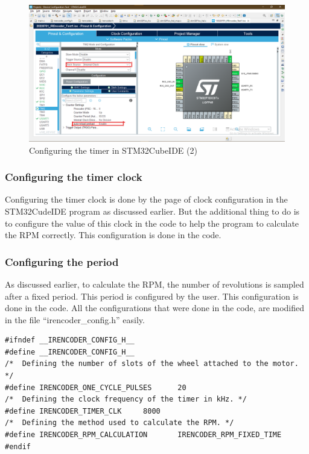 \begin{figure}[h]
    \centering
    \includegraphics[scale=.33]{figuresEncoder/10.png}
    \caption{Configuring the timer in STM32CubeIDE (2)}
\end{figure}
\clearpage
\subsubsection{Configuring the timer clock}
Configuring the timer clock is done by the page of clock configuration in the STM32CudeIDE program as discussed earlier. But the additional thing to do is to configure the value of this clock in the code to help the program to calculate the RPM correctly. This configuration is done in the code.

\subsubsection{Configuring the period}
As discussed earlier, to calculate the RPM, the number of revolutions is sampled after a fixed period. This period is configured by the user.
This configuration is done in the code.
All the configurations that were done in the code, are modified in the file “irencoder\_config.h” easily.

\begin{lstlisting}
#ifndef __IRENCODER_CONFIG_H__
#define __IRENCODER_CONFIG_H__
/*	Defining the number of slots of the wheel attached to the motor. */
#define IRENCODER_ONE_CYCLE_PULSES		20
/*	Defining the clock frequency of the timer in kHz. */
#define IRENCODER_TIMER_CLK		8000
/*	Defining the method used to calculate the RPM. */
#define IRENCODER_RPM_CALCULATION		IRENCODER_RPM_FIXED_TIME
#endif

\end{lstlisting}

